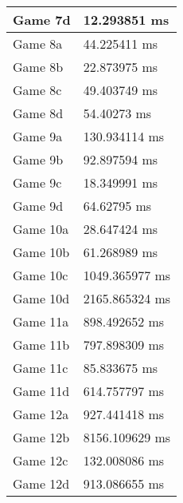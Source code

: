 \begin{tabular}{|l|l|}
	Game 7d & 12.293851 ms \\ \hline
	Game 8a & 44.225411 ms \\ \hline
	Game 8b & 22.873975 ms \\ \hline
	Game 8c & 49.403749 ms \\ \hline
	Game 8d & 54.40273 ms \\ \hline
	Game 9a & 130.934114 ms \\ \hline
	Game 9b & 92.897594 ms \\ \hline
	Game 9c & 18.349991 ms \\ \hline
	Game 9d & 64.62795 ms \\ \hline
	Game 10a & 28.647424 ms \\ \hline
	Game 10b & 61.268989 ms \\ \hline
	Game 10c & 1049.365977 ms \\ \hline
	Game 10d & 2165.865324 ms \\ \hline
	Game 11a & 898.492652 ms \\ \hline
	Game 11b & 797.898309 ms \\ \hline
	Game 11c & 85.833675 ms \\ \hline
	Game 11d & 614.757797 ms \\ \hline
	Game 12a & 927.441418 ms \\ \hline
	Game 12b & 8156.109629 ms \\ \hline
	Game 12c & 132.008086 ms \\ \hline
	Game 12d & 913.086655 ms \\ \hline
\end{tabular}
